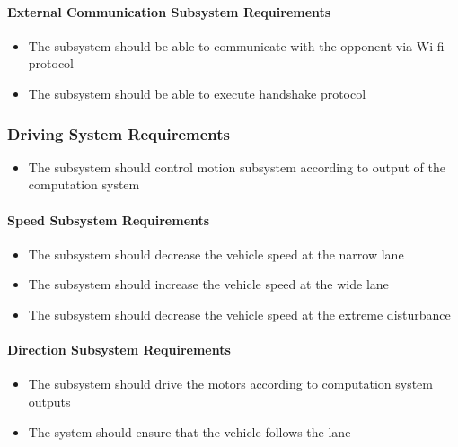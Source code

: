 \documentclass[a4paper,12pt]{article}
\begin{document}
	\paragraph{External Communication Subsystem Requirements}	
	
		\begin{itemize}
			\item The subsystem should be able to communicate with the opponent via Wi-fi protocol
			\item The subsystem should be able to execute handshake protocol
		\end{itemize}
	
	
	\subsubsection{Driving System Requirements}
	
		\begin{itemize}
			\item The subsystem should control motion subsystem according to output of the computation system
		\end{itemize}
	
	\paragraph{Speed Subsystem Requirements}	
		
		\begin{itemize}
			\item The subsystem should decrease the vehicle speed at the narrow lane 
			\item The subsystem should increase the vehicle speed at the wide lane 
			\item The subsystem should decrease the vehicle speed at the extreme disturbance  
		\end{itemize}
		
	\paragraph{Direction Subsystem Requirements}
	
		\begin{itemize}
			\item The subsystem should drive the motors according to computation system outputs
			\item The system should ensure that the vehicle follows the lane 
		\end{itemize}
\end{document}

